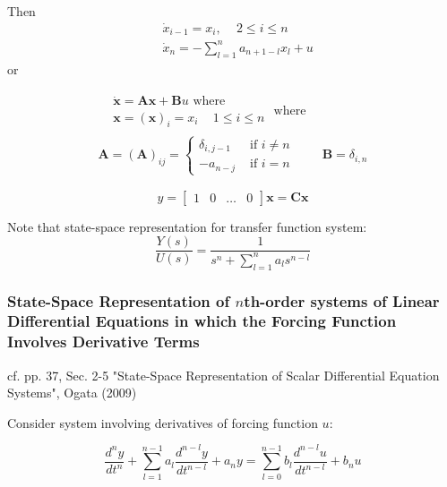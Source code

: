\documentclass[10pt]{amsart}
\begin{document}
\begin{multicols*}{2}
Then 
\begin{equation}
\begin{aligned}
& \dot{x}_{i-1} = x_i, \quad \, 2 \leq i \leq n \\
& \dot{x}_n = -\sum_{l=1}^n a_{n + 1 -l } x_l + u 
\end{aligned}
\end{equation}
or 

\begin{equation}
\begin{gathered}
\begin{aligned}
& \dot{\mathbf{x}} = \mathbf{A} \mathbf{x} + \mathbf{B} u \text{ where } \\
& \mathbf{x} = (\mathbf{x})_i = x_i \quad \, 1 \leq i \leq n 
\end{aligned} \text{ where } \\
\mathbf{A} = (\mathbf{A})_{ij} = \begin{cases} \delta_{i, j-1} & \text{ if } i \neq n \\ -a_{n-j}  & \text{ if } i = n \end{cases} \qquad \, \mathbf{B} = \delta_{i, n}
\end{gathered} 
\end{equation}

\begin{equation}
y = \left[ \begin{matrix} 1 & 0 & \dots & 0 \end{matrix} \right] \mathbf{x} = \mathbf{C} \mathbf{x}
\end{equation}

Note that state-space representation for transfer function system:
\begin{equation}
\frac{Y(s)}{U(s)} = \frac{1}{ s^n + \sum_{l=1}^{n} a_l s^{n-l} }
\end{equation}

\subsubsection{State-Space Representation of $n$th-order systems of Linear Differential Equations in which the Forcing Function Involves Derivative Terms}

cf. pp. 37, Sec. 2-5 "State-Space Representation of Scalar Differential Equation Systems", Ogata (2009) \cite{Ogat2009}

Consider system involving derivatives of forcing function $u$:

\begin{equation}\label{Eq:SystemWithDerivativesForcingFunction}
	\frac{d^n y}{dt^n} + \sum_{l=1}^{n-1} a_l \frac{d^{n-l} y}{dt^{n-l}}  + a_n y = \sum_{l=0}^{n-1} b_l \frac{d^{n-l} u}{dt^{n-l }} + b_nu
\end{equation}


\end{multicols*}
\end{document}
